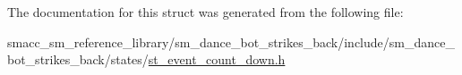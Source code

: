 The documentation for this struct was generated from the following file\+:\begin{DoxyCompactItemize}
\item 
smacc\+\_\+sm\+\_\+reference\+\_\+library/sm\+\_\+dance\+\_\+bot\+\_\+strikes\+\_\+back/include/sm\+\_\+dance\+\_\+bot\+\_\+strikes\+\_\+back/states/\hyperlink{strikes__back_2include_2sm__dance__bot__strikes__back_2states_2st__event__count__down_8h}{st\+\_\+event\+\_\+count\+\_\+down.\+h}\end{DoxyCompactItemize}
